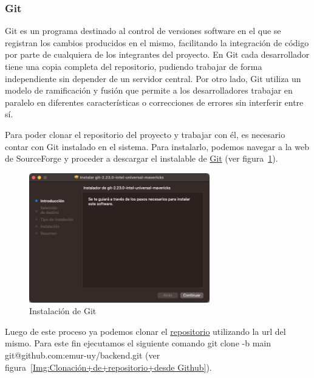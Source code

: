 \newpage


\subsubsection{Git}\label{git}
Git es un programa destinado al control de versiones software en el que se registran los cambios producidos en el mismo, facilitando la integración de código por parte de cualquiera de los integrantes del proyecto. En Git cada desarrollador tiene una copia completa del repositorio, pudiendo trabajar de forma independiente sin depender de un servidor central. Por otro lado, Git utiliza un modelo de ramificación y fusión que permite a los desarrolladores trabajar en paralelo en diferentes características o correcciones de errores sin interferir entre sí.

Para poder clonar el repositorio del proyecto y trabajar con él, es necesario contar con Git instalado en el sistema. 
Para instalarlo, podemos navegar a la web de SourceForge y proceder a descargar el instalable de \href{https://sourceforge.net/projects/git-osx-installer/files/git-2.23.0-intel-universal-mavericks.dmg/download?use_mirror=autoselect}{Git} (ver figura~\ref{Img:Instalación+de+Git}).

\begin{figure}[h]
    \centering
    \includegraphics[width=0.7\textwidth]{img/manual/instalar-git.png}
    \caption{Instalación de Git} \label{Img:Instalación+de+Git}
\end{figure} 

\newpage

Luego de este proceso ya podemos clonar el \href{https://github.com/emur-uy}{repositorio} utilizando la url del mismo. Para este fin ejecutamos el siguiente comando git clone -b main git@github.com:emur-uy/backend.git (ver figura~\ref{Img:Clonación+de+repositorio+desde Github}).

